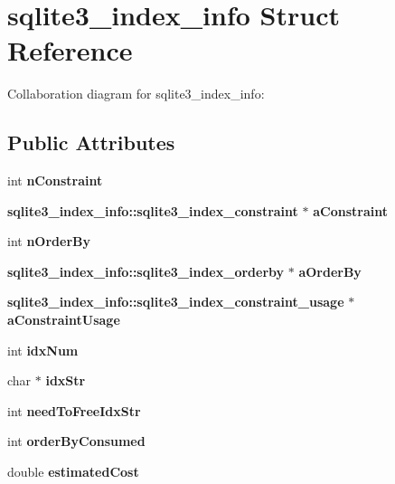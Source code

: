 \section{sqlite3\_\-index\_\-info Struct Reference}
\label{structsqlite3__index__info}
Collaboration diagram for sqlite3\_\-index\_\-info:\subsection*{Public Attributes}
\begin{CompactItemize}
\item 
int {\bf nConstraint}\label{structsqlite3__index__info_d5f4adc7482c06ccd22b2a6449a8f785}

\item 
{\bf sqlite3\_\-index\_\-info::sqlite3\_\-index\_\-constraint} $\ast$ \textbf{aConstraint}\label{structsqlite3__index__info_4896ff0e5406c7a3679fb23e51ad1061}

\item 
int {\bf nOrderBy}\label{structsqlite3__index__info_15e3c93cf5d8d7c86e94b303d48872db}

\item 
{\bf sqlite3\_\-index\_\-info::sqlite3\_\-index\_\-orderby} $\ast$ \textbf{aOrderBy}\label{structsqlite3__index__info_60db554cfbdaf31800eb333aee3e6f1e}

\item 
{\bf sqlite3\_\-index\_\-info::sqlite3\_\-index\_\-constraint\_\-usage} $\ast$ \textbf{aConstraintUsage}\label{structsqlite3__index__info_10451bff64af6d6733c34cc2654fec91}

\item 
int {\bf idxNum}\label{structsqlite3__index__info_faf2ebd5db0e0ccaccbcf4e3a7391f58}

\item 
char $\ast$ {\bf idxStr}\label{structsqlite3__index__info_d3aa8f088bcb7185aecac4ee06eae981}

\item 
int {\bf needToFreeIdxStr}\label{structsqlite3__index__info_3459b33099539c2e615729a8f773fa16}

\item 
int {\bf orderByConsumed}\label{structsqlite3__index__info_8e78cfb50b03abaae692e669b2dc78c8}

\item 
double {\bf estimatedCost}\label{structsqlite3__index__info_de68ab576208e4d8be52f13f5b3f9c19}

\end{CompactItemize}

